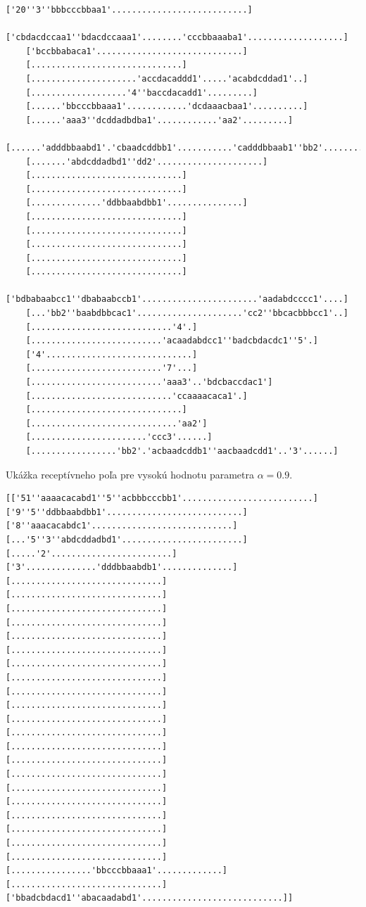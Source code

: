 \begin{lstlisting}[basicstyle=\footnotesize]
    ['20''3''bbbcccbbaa1'...........................]
    ['cbdacdccaa1''bdacdccaaa1'........'cccbbaaaba1'...................]
    ['bccbbabaca1'.............................]
    [..............................]
    [.....................'accdacaddd1'.....'acabdcddad1'..]
    [...................'4''baccdacadd1'.........]
    [......'bbcccbbaaa1'............'dcdaaacbaa1'..........]
    [......'aaa3''dcddadbdba1'............'aa2'.........]
    [......'adddbbaabd1'.'cbaadcddbb1'...........'cadddbbaab1''bb2'........]
    [.......'abdcddadbd1''dd2'.....................]
    [..............................]
    [..............................]
    [..............'ddbbaabdbb1'...............]
    [..............................]
    [..............................]
    [..............................]
    [..............................]
    [..............................]
    ['bdbabaabcc1''dbabaabccb1'.......................'aadabdcccc1'....]
    [...'bb2''baabdbbcac1'.....................'cc2''bbcacbbbcc1'..]
    [............................'4'.]
    [..........................'acaadabdcc1''badcbdacdc1''5'.]
    ['4'.............................]
    [..........................'7'...]
    [..........................'aaa3'..'bdcbaccdac1']
    [............................'ccaaaacaca1'.]
    [..............................]
    [.............................'aa2']
    [.......................'ccc3'......]
    [.................'bb2'.'acbaadcddb1''aacbaadcdd1'..'3'......]
\end{lstlisting}

Ukážka receptívneho poľa pre vysokú hodnotu parametra $\alpha = 0.9$.


\begin{lstlisting}[basicstyle=\footnotesize]
    [['51''aaaacacabd1''5''acbbbcccbb1'..........................]
['9''5''ddbbaabdbb1'...........................]
['8''aaacacabdc1'............................]
[...'5''3''abdcddadbd1'........................]
[.....'2'........................]
['3'..............'dddbbaabdb1'..............]
[..............................]
[..............................]
[..............................]
[..............................]
[..............................]
[..............................]
[..............................]
[..............................]
[..............................]
[..............................]
[..............................]
[..............................]
[..............................]
[..............................]
[..............................]
[..............................]
[..............................]
[..............................]
[..............................]
[..............................]
[..............................]
[................'bbcccbbaaa1'.............]
[..............................]
['bbadcbdacd1''abacaadabd1'............................]]
\end{lstlisting}

